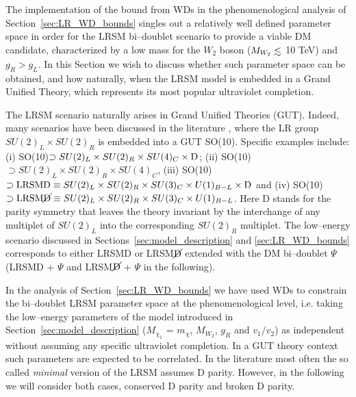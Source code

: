 \documentclass[11pt]{article}
\newcommand{\lsim}{\mathrel{\mathop{\kern 0pt \rlap
      {\raise.2ex\hbox{$<$}}}\lower.9ex\hbox{\kern-.190em $ \sim$}}}
\begin{document}
The implementation of the bound from WDs in the phenomenological analysis of Section~\ref{sec:LR_WD_bounds} singles out a relatively well defined parameter space in order for the LRSM bi--doublet scenario to provide a viable DM candidate, characterized by a low mass for the $W_2$ boson ($M_{W_2}\lsim$ 10 TeV) and $g_R>g_L$. In this Section we wish to discuss whether such parameter space can be obtained, and how naturally, when  
the LRSM model is embedded in a Grand Unified Theory, which represents its most popular ultraviolet completion.

The LRSM scenario naturally arises in Grand Unified Theories (GUT). Indeed, many scenarios have been discussed in the literature \cite{Pati:1974yy,Kibble:1982dd,Rizzo:1981jr,Rizzo:1981dm,Mohapatra:1980yp,Deshpande:1990ip}, where the LR group $SU(2)_L\times SU(2)_R$ is embedded into a GUT SO(10). Specific examples include: (i) SO(10)$\supset SU(2)_L\times SU(2)_R \times SU(4)_C \times {\rm D}$; (ii) SO(10)$\supset SU(2)_L\times SU(2)_R \times SU(4)_C$,
(iii) SO(10)$\supset %
{\rm LRSMD}\equiv SU(2)_L\times SU(2)_R \times SU(3)_C \times U(1)_{B-L} \times {\rm D}$  and
(iv) SO(10)$\supset {\rm LRSM}\cancel{\rm D}\equiv SU(2)_L\times SU(2)_R \times SU(3)_C \times U(1)_{B-L}$. Here D stands for the parity symmetry that leaves the theory 
invariant by the interchange of any multiplet of $SU(2)_L$ into the corresponding  $SU(2)_R$ multiplet. 
The low--energy scenario discussed in Sections~\ref{sec:model_description} and \ref{sec:LR_WD_bounds} 
corresponds to either LRSMD or LRSM$\cancel{\rm D}$ extended with the DM bi--doublet $\Psi$ 
(LRSMD + $\Psi$ and   
LRSM$\cancel{\rm D}$ + $\Psi$ in the following).

In the analysis of Section~\ref{sec:LR_WD_bounds} we have used WDs to constrain the bi--doublet LRSM parameter space at the phenomenological level, i.e. taking the low--energy parameters of the model introduced in Section~\ref{sec:model_description} ($M_{\chi_1}$ = $m_{\chi}$, $M_{W_2}$, $g_R$ and $v_1/v_2$) as independent without assuming any specific ultraviolet completion. In a GUT theory context such parameters are expected to be correlated. In the literature most often the so called \emph{minimal} version of the LRSM assumes D parity.
However, in the following we will consider both cases, conserved D parity and broken D parity. 
\end{document}
